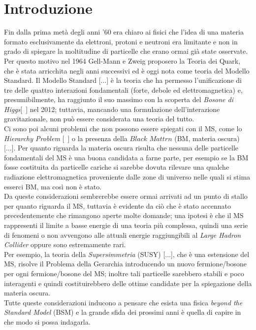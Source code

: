 %
\section{Introduzione}
\label{sec:introduzione}
%
Fin dalla prima metà degli anni '60 era chiaro ai fisici che l'idea di una materia formato esclusivamente da elettroni, protoni e neutroni era limitante e non in grado di spiegare la moltitudine di particelle che erano ormai già state osservate. Per questo motivo nel 1964 Gell-Mann e Zweig proposero la Teoria dei Quark, che è stata arricchita negli anni successivi ed è oggi nota come teoria del Modello Standard. 
Il Modello Standard [...] è la teoria che ha permesso l'unificazione di tre delle quattro interazioni fondamentali (forte, debole ed elettromagnetica) e, presumibilmente, ha raggiunto il suo massimo con la scoperta del \textit{Bosone di Higgs}[~\cite{Bosone_di_Higgs}] nel 2012; tuttavia, mancando una formulazione dell'interazione gravitazionale, non può essere considerata una teoria del tutto. \\
Ci sono poi alcuni problemi che non possono essere spiegati con il MS, come lo \textit{Hierarchy Problem} [~\cite{ProblemaGerarchia}]
o la presenza della $\textit{Black Mattrn}$ (BM, materia oscura) [...]. Per quanto riguarda la materia oscura risulta che nessuna delle particelle fondamentali del MS è una buona candidata a farne parte, per esempio se la BM fosse costituita da particelle cariche si sarebbe dovuta rilevare una qualche radiazione elettromagnetica proveniente dalle zone di universo nelle quali si stima esserci BM, ma così non è stato.  \\
Da queste considerazioni sembrerebbe essere ormai arrivati ad un punto di stallo per quanto riguarda il MS, tuttavia è evidente da ciò che è stato accennato precedentemente che rimangono aperte molte domande; una ipotesi è che il MS rappresenti il limite a basse energie di una teoria più complessa, quindi una serie di fenomeni o non avvengono alle attuali energie raggiungibili al \textit{Large Hadron Collider} oppure sono estremamente rari. \\
Per esempio, la teoria della \textit{Supersimmetria} (SUSY) [...], che è una estensione del MS, risolve il Problema della Gerarchia introducendo un nuovo fermione/bosone per ogni fermione/bosone del MS; inoltre tali particelle sarebbero stabili e poco interagenti e quindi costituirebbero delle ottime candidate per la spiegazione della materia oscura. \\
Tutte queste considerazioni inducono a pensare che esista una fisica \textit{beyond the Standard Model} (BSM) e la grande sfida dei prossimi anni è quella di capire in che modo si possa indagarla. \\
